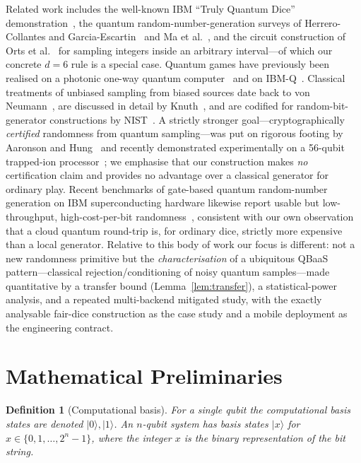 \documentclass[journal]{IEEEtran}
\newtheorem{definition}{Definition}
\begin{document}
Related work includes the well-known IBM ``Truly Quantum Dice'' demonstration~\cite{ibmq2024dice}, the quantum random-number-generation surveys of Herrero-Collantes and Garcia-Escartin~\cite{herrero2023quantumrng} and Ma et al.~\cite{ma2016quantum}, and the circuit construction of Orts et al.~\cite{orts2023quantum} for sampling integers inside an arbitrary interval---of which our concrete $d=6$ rule is a special case. Quantum games have previously been realised on a photonic one-way quantum computer~\cite{prevedel2007experimental} and on IBM-Q~\cite{galas2020quantum}. Classical treatments of unbiased sampling from biased sources date back to von Neumann~\cite{vonneumann1951various}, are discussed in detail by Knuth~\cite{knuth1997seminumerical}, and are codified for random-bit-generator constructions by NIST~\cite{nist80090c}. A strictly stronger goal---cryptographically \emph{certified} randomness from quantum sampling---was put on rigorous footing by Aaronson and Hung~\cite{aaronson2023certified} and recently demonstrated experimentally on a 56-qubit trapped-ion processor~\cite{liu2025certified}; we emphasise that our construction makes \emph{no} certification claim and provides no advantage over a classical generator for ordinary play. Recent benchmarks of gate-based quantum random-number generation on IBM superconducting hardware likewise report usable but low-throughput, high-cost-per-bit randomness~\cite{louamri2025qrng}, consistent with our own observation that a cloud quantum round-trip is, for ordinary dice, strictly more expensive than a local generator. Relative to this body of work our focus is different: not a new randomness primitive but the \emph{characterisation} of a ubiquitous QBaaS pattern---classical rejection/conditioning of noisy quantum samples---made quantitative by a transfer bound (Lemma~\ref{lem:transfer}), a statistical-power analysis, and a repeated multi-backend mitigated study, with the exactly analysable fair-dice construction as the case study and a mobile deployment as the engineering contract.

\section{Mathematical Preliminaries}

\begin{definition}[Computational basis]
For a single qubit the computational basis states are denoted $|0\rangle,|1\rangle$. An $n$-qubit system has basis states $|x\rangle$ for $x\in\{0,1,\dots,2^n-1\}$, where the integer $x$ is the binary representation of the bit string.
\end{definition}
\end{document}
